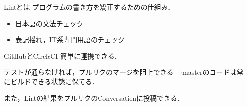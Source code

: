 \documentclass{beamer}
\begin{document}
\begin{frame}{Lintとは}
  プログラムの書き方を矯正するための仕組み．

  \begin{itemize}
    \item 日本語の文法チェック
    \item 表記揺れ，IT系専門用語のチェック
  \end{itemize}
\end{frame}

\begin{frame}{GitHubとCircleCI}
  簡単に連携できる．

  テストが通らなければ，プルリクのマージを阻止できる
  →masterのコードは常にビルドできる状態に保てる．

  また，Lintの結果をプルリクのConversationに投稿できる．
\end{frame}
\end{document}
